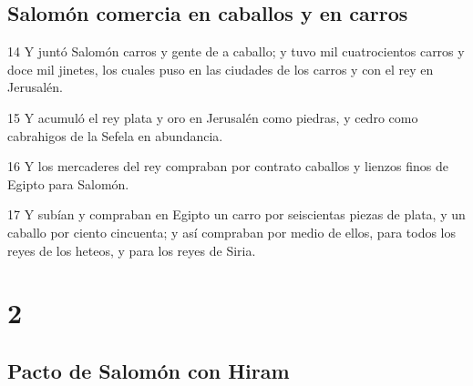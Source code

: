 \section*{Salomón comercia en caballos y en carros}

\par 14 Y juntó Salomón carros y gente de a caballo; y tuvo mil cuatrocientos carros y doce mil jinetes, los cuales puso en las ciudades de los carros y con el rey en Jerusalén.
\par 15 Y acumuló el rey plata y oro en Jerusalén como piedras, y cedro como cabrahigos de la Sefela en abundancia.
\par 16 Y los mercaderes del rey compraban por contrato caballos y lienzos finos de Egipto para Salomón. 
\par 17 Y subían y compraban en Egipto un carro por seiscientas piezas de plata, y un caballo por ciento cincuenta; y así compraban por medio de ellos, para todos los reyes de los heteos, y para los reyes de Siria.

\chapter{2}

\section*{Pacto de Salomón con Hiram }

